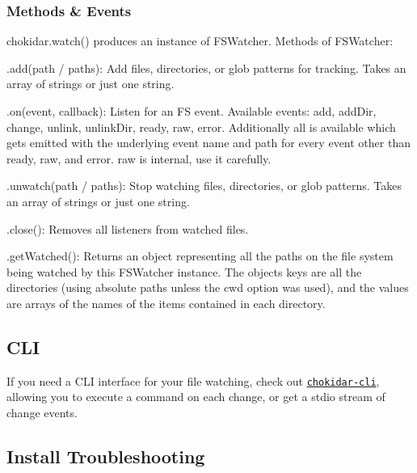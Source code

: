 \subsubsection*{Methods \& Events}

{\ttfamily chokidar.\+watch()} produces an instance of {\ttfamily F\+S\+Watcher}. Methods of {\ttfamily F\+S\+Watcher}\+:


\begin{DoxyItemize}
\item {\ttfamily .add(path / paths)}\+: Add files, directories, or glob patterns for tracking. Takes an array of strings or just one string.
\item {\ttfamily .on(event, callback)}\+: Listen for an FS event. Available events\+: {\ttfamily add}, {\ttfamily add\+Dir}, {\ttfamily change}, {\ttfamily unlink}, {\ttfamily unlink\+Dir}, {\ttfamily ready}, {\ttfamily raw}, {\ttfamily error}. Additionally {\ttfamily all} is available which gets emitted with the underlying event name and path for every event other than {\ttfamily ready}, {\ttfamily raw}, and {\ttfamily error}. {\ttfamily raw} is internal, use it carefully.
\item {\ttfamily .unwatch(path / paths)}\+: Stop watching files, directories, or glob patterns. Takes an array of strings or just one string.
\item {\ttfamily .close()}\+: Removes all listeners from watched files.
\item {\ttfamily .get\+Watched()}\+: Returns an object representing all the paths on the file system being watched by this {\ttfamily F\+S\+Watcher} instance. The object\textquotesingle{}s keys are all the directories (using absolute paths unless the {\ttfamily cwd} option was used), and the values are arrays of the names of the items contained in each directory.
\end{DoxyItemize}

\subsection*{C\+LI}

If you need a C\+LI interface for your file watching, check out \href{https://github.com/kimmobrunfeldt/chokidar-cli}{\tt chokidar-\/cli}, allowing you to execute a command on each change, or get a stdio stream of change events.

\subsection*{Install Troubleshooting}


